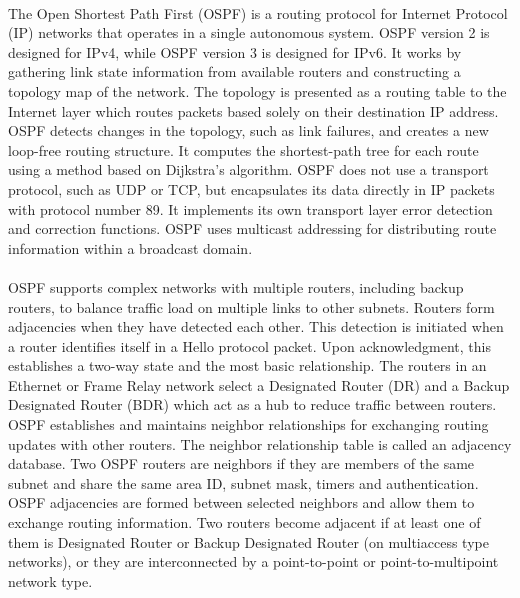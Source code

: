 \documentclass[12pt,a4paper]{report}
\begin{document}
\paragraph{}The Open Shortest Path First (OSPF) is a routing protocol for Internet Protocol (IP) networks that operates in a single autonomous system. OSPF version 2 is designed for IPv4, while OSPF version 3 is designed for IPv6. It works by gathering link state information from available routers and constructing a topology map of the network. The topology is presented as a routing table to the Internet layer which routes packets based solely on their destination IP address. OSPF detects changes in the topology, such as link failures, and creates a new loop-free routing structure. It computes the shortest-path tree for each route using a method based on Dijkstra's algorithm. OSPF does not use a transport protocol, such as UDP or TCP, but encapsulates its data directly in IP packets with protocol number 89. It implements its own transport layer error detection and correction functions. OSPF uses multicast addressing for distributing route information within a broadcast domain.
\paragraph{}OSPF supports complex networks with multiple routers, including backup routers, to balance traffic load on multiple links to other subnets. Routers form adjacencies when they have detected each other. This detection is initiated when a router identifies itself in a Hello protocol packet. Upon acknowledgment, this establishes a two-way state and the most basic relationship. The routers in an Ethernet or Frame Relay network select a Designated Router (DR) and a Backup Designated Router (BDR) which act as a hub to reduce traffic between routers. OSPF establishes and maintains neighbor relationships for exchanging routing updates with other routers. The neighbor relationship table is called an adjacency database. Two OSPF routers are neighbors if they are members of the same subnet and share the same area ID, subnet mask, timers and authentication. OSPF adjacencies are formed between selected neighbors and allow them to exchange routing information. Two routers become adjacent if at least one of them is Designated Router or Backup Designated Router (on multiaccess type networks), or they are interconnected by a point-to-point or point-to-multipoint network type.
\end{document}
